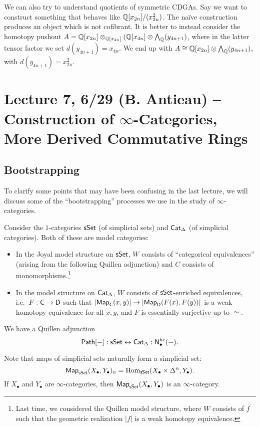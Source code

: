\documentclass{amsart}
\begin{document}
\begin{ex}
	We can also try to understand quotients of symmetric CDGAs.
	Say we want to construct something that behaves like $\mathbb{Q}[x_{2n}] / (x_{2n}^2)$.
	The na\"ive construction produces an object which is not cofibrant.
	It is better to instead consider the homotopy pushout $A = \mathbb{Q}[x_{2n}] \otimes_{\mathbb{Q}[x_{4n}]} (\mathbb{Q}[x_{4n}] \otimes \bigwedge_{\mathbb{Q}} (y_{4n+1})$, where in the latter tensor factor we set $d(y_{4n+1}) = x_{4n}$.
	We end up with $A \cong \mathbb{Q}[x_{2n}] \otimes \bigwedge_{\mathbb{Q}}(y_{4n+1})$, with $d(y_{4n+1}) = x_{2n}^2$.
\end{ex}

\section{Lecture 7, 6/29 (B. Antieau) -- Construction of $\infty$-Categories, More Derived Commutative Rings}

\subsection{Bootstrapping}

To clarify some points that may have been confusing in the last lecture, we will discuss some of the ``bootstrapping'' processes we use in the study of $\infty$-categories.

Consider the $1$-categories $\mathsf{sSet}$ (of simplicial sets) and $\mathsf{Cat}_\Delta$ (of simplicial categories).
Both of these are model categories:
\begin{itemize}
	\item In the Joyal model structure on $\mathsf{sSet}$, $W$ consists of ``categorical equivalences'' (arising from the following Quillen adjunction) and $C$ consists of monomorphisms.\footnote{Last time, we considered the Quillen model structure, where $W$ consists of $f$ such that the geometric realization $|f|$ is a weak homotopy equivalence.}
	\item In the model structure on $\mathsf{Cat}_\Delta$, $W$ consists of $\mathsf{sSet}$-enriched equivalences, i.e.\ $F: \mathsf{C} \to \mathsf{D}$ such that $\left|\mathsf{Map}_{\mathsf{C}}(x, y)\right| \to \left|\mathsf{Map}_{\mathsf{D}}(F(x), F(y))\right|$ is a weak homotopy equivalence for all $x, y$, and $F$ is essentially surjective up to $\simeq$.
\end{itemize}
We have a Quillen adjunction 
\[
	\mathsf{Path}[-]: \mathsf{sSet} \leftrightarrow \mathsf{Cat}_\Delta :\mathsf{N}_\bullet^{\mathrm{hc}}(-).
\]

Note that maps of simplicial sets naturally form a simplicial set:
\[
	\mathsf{Map}_{\mathsf{sSet}}(X_\bullet, Y_\bullet)_n = \operatorname{Hom}_{\mathsf{sSet}}(X_\bullet \times \Delta^n, Y_\bullet).
\]
If $X_\bullet$ and $Y_\bullet$ are $\infty$-categories, then $\mathsf{Map}_{\mathsf{sSet}}(X_\bullet, Y_\bullet)$ is an $\infty$-category.
\end{document}
